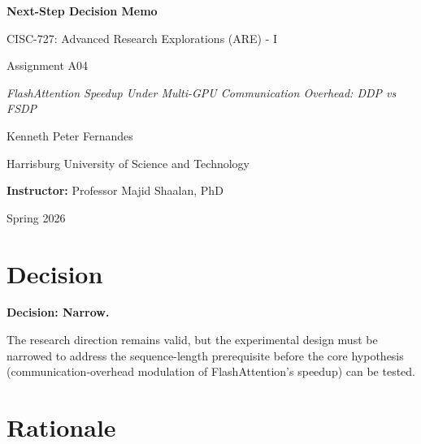 \documentclass[12pt, a4paper]{article}
\begin{document}
\begin{titlepage}
    \centering
    \vspace*{2cm}
    {\LARGE \textbf{Next-Step Decision Memo} \par}
    \vspace{1cm}
    {\large CISC-727: Advanced Research Explorations (ARE) - I \par}
    \vspace{0.5cm}
    {\large Assignment A04 \par}
    \vspace{1.5cm}
    {\large\itshape FlashAttention Speedup Under Multi-GPU Communication Overhead: DDP vs FSDP \par}
    \vspace{2cm}
    {\large Kenneth Peter Fernandes \par}
    \vspace{0.5cm}
    {\large Harrisburg University of Science and Technology \par}
    \vspace{1cm}
    {\large \textbf{Instructor:} Professor Majid Shaalan, PhD \par}
    \vspace{1cm}
    {\large Spring 2026 \par}
\end{titlepage}

\section{Decision}

\textbf{Decision: Narrow.}

The research direction remains valid, but the experimental design must be narrowed to address the sequence-length prerequisite before the core hypothesis (communication-overhead modulation of FlashAttention's speedup) can be tested.

\section{Rationale}
\end{document}
